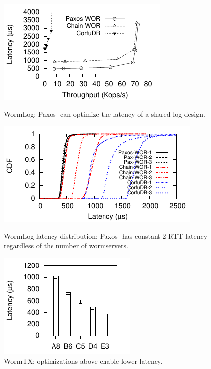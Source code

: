 \begin{figure}
\begin{minipage}[t]{0.32\textwidth}
\vspace{0pt}
\includegraphics{graphs/veri_wormspace_corfu}
\caption{WormLog: Paxos-\WOR{} can optimize the latency of a shared log design.\label{fig:corfu}}
\end{minipage}
\hspace{0.1in}
\begin{minipage}[t]{0.37\textwidth}
\vspace{0pt}
\includegraphics{graphs/log_latency_cdf.pdf}
\caption{WormLog latency distribution: Paxos-\WOR{} has constant 2 RTT latency regardless of the number of wormservers. \label{fig:corfu_latency}}
\end{minipage}
\hspace{0.1in}
\begin{minipage}[t]{0.26\textwidth}
\vspace{0pt}
\includegraphics{graphs/2pc_latency.pdf}
\caption{WormTX: optimizations above \sysname{} enable lower latency.\label{fig:2pc}}
\end{minipage}
\end{figure}

